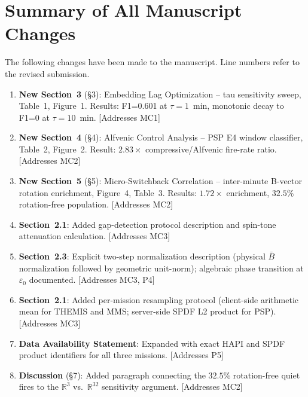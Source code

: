 \documentclass{article}
\begin{document}
\clearpage

\section*{Summary of All Manuscript Changes}

The following changes have been made to the manuscript.  Line numbers
refer to the revised submission.

\begin{enumerate}
  \item \textbf{New Section~3} (\S3): Embedding Lag Optimization -- tau
    sensitivity sweep, Table~1, Figure~1.  Results: F1=0.601 at
    $\tau=1$~min, monotonic decay to F1=0 at $\tau=10$~min.
    [Addresses MC1]

  \item \textbf{New Section~4} (\S4): Alfvenic Control Analysis -- PSP E4
    window classifier, Table~2, Figure~2.  Result: $2.83\times$
    compressive/Alfvenic fire-rate ratio.
    [Addresses MC2]

  \item \textbf{New Section~5} (\S5): Micro-Switchback Correlation --
    inter-minute B-vector rotation enrichment, Figure~4, Table~3.
    Results: $1.72\times$ enrichment, $32.5\%$ rotation-free population.
    [Addresses MC2]

  \item \textbf{Section~2.1}: Added gap-detection protocol description
    and spin-tone attenuation calculation.  [Addresses MC3]

  \item \textbf{Section~2.3}: Explicit two-step normalization description
    (physical $\bar{B}$ normalization followed by geometric unit-norm);
    algebraic phase transition at $\varepsilon_0$ documented.
    [Addresses MC3, P4]

  \item \textbf{Section~2.1}: Added per-mission resampling protocol
    (client-side arithmetic mean for THEMIS and MMS; server-side SPDF
    L2 product for PSP).  [Addresses MC3]

  \item \textbf{Data Availability Statement}: Expanded with exact HAPI
    and SPDF product identifiers for all three missions.  [Addresses P5]

  \item \textbf{Discussion} (\S7): Added paragraph connecting the
    $32.5\%$ rotation-free quiet fires to the $\mathbb{R}^3$
    vs.\ $\mathbb{R}^{32}$ sensitivity argument.  [Addresses MC2]
\end{enumerate}
\end{document}

